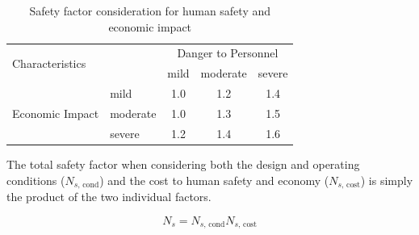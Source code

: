\documentclass[
10pt,
a4paper,
openany,
svgnames,
]{book}
\begin{document}
\begin{table}[h]
  \centering
  \begin{tabular}{llccc}
    \toprule
    \multicolumn{2}{l}{\multirow{2}{2cm}{Characteristics}} & \multicolumn{3}{c}{Danger to Personnel} \\
    \cmidrule{3-5}
                                       &          & mild & moderate & severe \\
    \midrule
    \multirow{3}{3cm}{Economic Impact} & mild     & 1.0  & 1.2      & 1.4    \\
                                       & moderate & 1.0  & 1.3      & 1.5    \\
                                       & severe   & 1.2  & 1.4      & 1.6    \\
    \bottomrule
  \end{tabular}
  \caption{Safety factor consideration for human safety and economic impact}
  \label{tab: safety factor safety econ}
\end{table}

The total safety factor when considering both the design and operating conditions ($N_{s\text{, cond}}$) and the cost to human safety and economy ($N_{s\text{, cost}}$) is simply the product of the two individual factors.

\begin{equation}
  \label{eq: total safety factor}
  N_s = N_{s\text{, cond}} N_{s\text{, cost}}
\end{equation}
\end{document}
